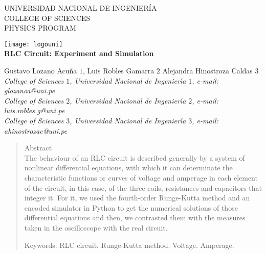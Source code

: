 \documentclass[10pt,a4paper]{article}
\begin{document}
\begin{center}
	\hfill 
	\parbox{0.5\linewidth}{%
		\centering
		UNIVERSIDAD NACIONAL DE INGENIERÍA\\
		COLLEGE OF SCIENCES\\
        PHYSICS PROGRAM\par
		\vspace{.05\textheight}
	}
	\hfill
	\texttt{[image: logouni]}\\
	\vspace{.005\textheight}
	{\Large \textbf{RLC Circuit: Experiment and Simulation}}
\end{center}
 
\begin{center}
Gustavo Lozano Acuña $1$, Luis Robles Gamarra $2$ Alejandra Hinostroza Caldas $3$ \vskip12pt
{\it College of Sciences $1$, Universidad Nacional de Ingenier\'{\i}a $1$, e-mail: glozanoa@uni.pe\\
College of Sciences $2$, Universidad Nacional de Ingenier\'{\i}a $2$, e-mail: luis.robles.g@uni.pe\\
College of Sciences $3$, Universidad Nacional de Ingenier\'{\i}a $3$, e-mail: ahinostrozac@uni.pe }
\end{center}

\begin{quotation}
{\small
\begin{center}
Abstract\\
The behaviour of an RLC circuit is described generally by a system of nonlinear differential equations, with which it can determinate the characteristic functions or curves of voltage and amperage in each element of the circuit, in this case, of the three coils, resistances and capacitors that integer it. For it, we used the fourth-order Runge-Kutta method and an encoded simulator in Python to get the numerical solutions of those differential equations and then, we contrasted them with the measures taken in the oscilloscope with the real circuit.
\end{center}

Keywords: RLC circuit. Runge-Kutta method. Voltage. Amperage.\\ 
}
\end{quotation}
\end{document}
